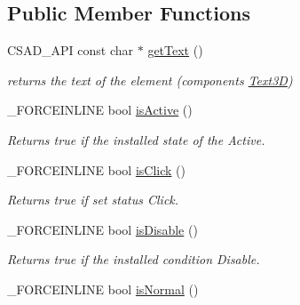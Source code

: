 \subsection*{Public Member Functions}
\begin{DoxyCompactItemize}
\item 
\hypertarget{classcsad_1_1_s_g_element_a1ac3dbf52e5e3b2fca6092724eeeac28}{C\-S\-A\-D\-\_\-\-A\-P\-I const char $\ast$ \hyperlink{classcsad_1_1_s_g_element_a1ac3dbf52e5e3b2fca6092724eeeac28}{get\-Text} ()}\label{classcsad_1_1_s_g_element_a1ac3dbf52e5e3b2fca6092724eeeac28}

\begin{DoxyCompactList}\small\item\em returns the text of the element (components \hyperlink{classcsad_1_1_text3_d}{Text3\-D}) \end{DoxyCompactList}\item 
\hypertarget{classcsad_1_1_s_g_element_abb1870688c04a966bf5b9761821408ed}{\-\_\-\-F\-O\-R\-C\-E\-I\-N\-L\-I\-N\-E bool \hyperlink{classcsad_1_1_s_g_element_abb1870688c04a966bf5b9761821408ed}{is\-Active} ()}\label{classcsad_1_1_s_g_element_abb1870688c04a966bf5b9761821408ed}

\begin{DoxyCompactList}\small\item\em Returns true if the installed state of the Active. \end{DoxyCompactList}\item 
\hypertarget{classcsad_1_1_s_g_element_a082c989cb5c2c68f097a74e6bfe5970a}{\-\_\-\-F\-O\-R\-C\-E\-I\-N\-L\-I\-N\-E bool \hyperlink{classcsad_1_1_s_g_element_a082c989cb5c2c68f097a74e6bfe5970a}{is\-Click} ()}\label{classcsad_1_1_s_g_element_a082c989cb5c2c68f097a74e6bfe5970a}

\begin{DoxyCompactList}\small\item\em Returns true if set status Click. \end{DoxyCompactList}\item 
\hypertarget{classcsad_1_1_s_g_element_ae8e93f923232bd36b59607f2ace0a0ad}{\-\_\-\-F\-O\-R\-C\-E\-I\-N\-L\-I\-N\-E bool \hyperlink{classcsad_1_1_s_g_element_ae8e93f923232bd36b59607f2ace0a0ad}{is\-Disable} ()}\label{classcsad_1_1_s_g_element_ae8e93f923232bd36b59607f2ace0a0ad}

\begin{DoxyCompactList}\small\item\em Returns true if the installed condition Disable. \end{DoxyCompactList}\item 
\hypertarget{classcsad_1_1_s_g_element_a1ea41106e94caf152d2c540d03c9c373}{\-\_\-\-F\-O\-R\-C\-E\-I\-N\-L\-I\-N\-E bool \hyperlink{classcsad_1_1_s_g_element_a1ea41106e94caf152d2c540d03c9c373}{is\-Normal} ()}\label{classcsad_1_1_s_g_element_a1ea41106e94caf152d2c540d03c9c373}


\end{DoxyCompactItemize}

